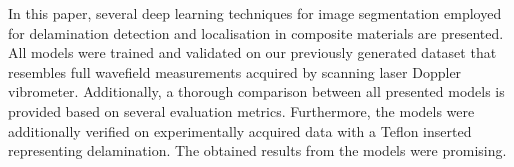 In this paper, several deep learning techniques for image segmentation employed for delamination detection and localisation in composite materials are presented.
All models were trained and validated on our previously generated dataset that resembles full wavefield measurements acquired by scanning laser Doppler vibrometer.
Additionally, a thorough comparison between all presented models is provided based on several evaluation metrics.
Furthermore, the models were additionally verified on experimentally acquired data with a Teflon inserted representing delamination.
The obtained results from the models were promising.

